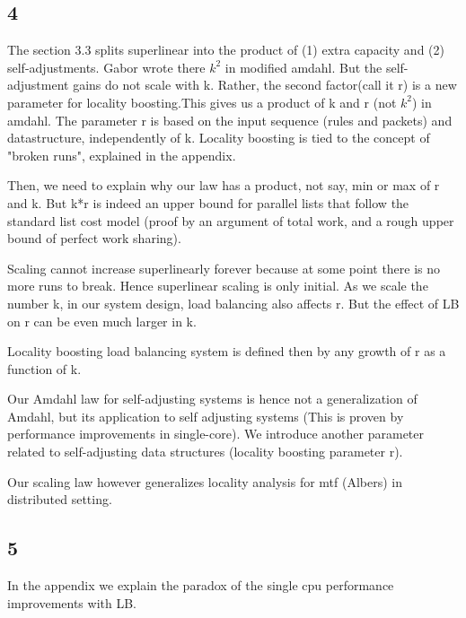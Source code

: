 \subsection{4}



The section 3.3 splits superlinear into the product  of (1) extra  capacity and (2) self-adjustments. Gabor wrote there $k^2$ in modified amdahl. But the self-adjustment gains do not scale with k. Rather, the second factor(call it r) is a new parameter for locality boosting.This gives us a product of k and r (not $k^2$) in amdahl. The parameter  r is based on the input sequence (rules and packets) and datastructure, independently of k. Locality boosting is tied to the concept of "broken runs", explained in the appendix.

Then, we need to explain why our law has a product, not say, min or max of r and k. But k*r is indeed an upper bound for parallel lists that follow the standard list cost model  (proof by an argument of total work, and a rough upper bound of perfect work sharing).

Scaling cannot increase superlinearly forever because at some point there is no more runs to break. Hence superlinear scaling is only initial. As we scale the number k, in our system design, load balancing also affects r. But the effect of LB on r can be even much larger in k.

Locality boosting load balancing system is defined then by any growth of r as a function of k.



Our Amdahl law for self-adjusting systems is hence not a generalization of Amdahl, but its application to self adjusting systems (This is proven by performance improvements in single-core). We introduce another parameter related to self-adjusting  data structures (locality boosting parameter r).










Our scaling law however generalizes locality analysis for mtf (Albers) in distributed setting.

\subsection{5}



In the appendix we explain the paradox of the single cpu performance improvements with LB.

